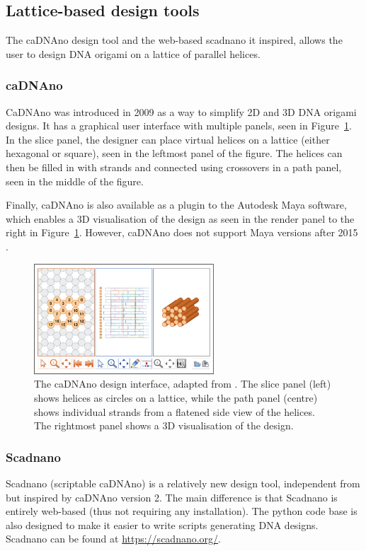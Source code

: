 \subsection{Lattice-based design tools}
The caDNAno design tool \cite{cadnano} and the web-based scadnano \cite{scadnano} it inspired, allows the user to design DNA origami on a lattice of parallel helices.
\subsubsection{caDNAno}
\label{sec:cadnano}
CaDNAno \cite{cadnano} was introduced in 2009 as a way to simplify 2D and 3D DNA origami designs. It has a graphical user interface with multiple panels, seen in Figure~\ref{fig:cadnano}. In the slice panel, the designer can place virtual helices on a lattice (either hexagonal or square), seen in the leftmost panel of the figure. The helices can then be filled in with strands and connected using crossovers in a path panel, seen in the middle of the figure.

Finally, caDNAno is also available as a plugin to the Autodesk Maya software, which enables a 3D visualisation of the design as seen in the render panel to the right in Figure~\ref{fig:cadnano}. However, caDNAno does not support Maya versions after 2015 \cite{cadnanoInstall}.

\begin{figure}[h]
  \begin{center}
    \includegraphics[width=0.6\textwidth]{figures/cadnano.jpeg}
    \caption{The caDNAno design interface, adapted from \cite{cadnano}. The slice panel (left) shows helices as circles on a lattice, while the path panel (centre) shows individual strands from a flatened side view of the helices. The rightmost panel shows a 3D visualisation of the design.}
    \label{fig:cadnano}
  \end{center}
\end{figure}

\subsubsection{Scadnano}
Scadnano \cite{scadnano} (scriptable caDNAno) is a relatively new design tool, independent from but inspired by caDNAno version 2. The main difference is that Scadnano is entirely web-based (thus not requiring any installation). The python code base is also designed to make it easier to write scripts generating DNA designs. Scadnano can be found at \url{https://scadnano.org/}.

